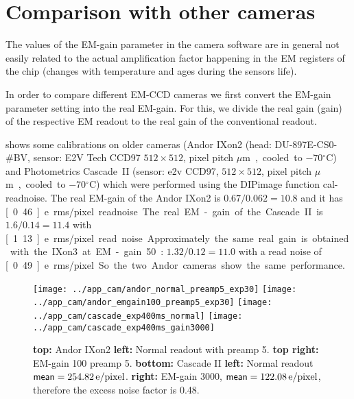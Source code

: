 \section{Comparison with other cameras}
The values of the EM-gain parameter in the camera software are in
general not easily related to the actual amplification factor
happening in the EM registers of the chip (changes with temperature
and ages during the sensors life). 

In order to compare different EM-CCD cameras we first convert the
EM-gain parameter setting into the real EM-gain. For this, we divide
the real gain (\textsf{gain}) of the respective EM readout to the real
gain of the conventional readout.

 shows some calibrations on older cameras (Andor
IXon2 (head: DU-897E-CS0-\#BV, sensor: E2V Tech CCD97 $512\times512$,
pixel pitch \unit[16]{$\mu$m}, cooled to $-70{}^\circ\textrm{C}$) and
Photometrics Cascade~II (sensor: e2v CCD97, $512\times512$, pixel
pitch \unit[16]{$\mu$m}, cooled to $-70{}^\circ\textrm{C}$) which were
performed using the DIPimage function \textsf{cal-readnoise}.  The
real EM-gain of the Andor IXon2 is $0.67/0.062=10.8$ and it has
\unit[0.46]{e\ rms/pixel} readnoise. The real EM-gain of the Cascade~II
is $1.6/0.14=11.4$ with \unit[1.13]{e\ rms/pixel} read
noise. Approximately the same real gain is obtained with the IXon3 at
EM-gain 50: $1.32/0.12=11.0$ with a read noise of \unit[0.49]{e\
  rms/pixel}. So the two Andor cameras show the same performance.

\begin{figure}
  \centering
  \texttt{[image: ../app\_cam/andor\_normal\_preamp5\_exp30]}
  \texttt{[image: ../app\_cam/andor\_emgain100\_preamp5\_exp30]}
  \texttt{[image: ../app\_cam/cascade\_exp400ms\_normal]}
  \texttt{[image: ../app\_cam/cascade\_exp400ms\_gain3000]}
  \caption{{\bf top:} Andor IXon2 {\bf left:} Normal readout with
    preamp 5. {\bf top right:} EM-gain 100 preamp 5. {\bf bottom:}
    Cascade II {\bf left:} Normal readout
    $\textsf{mean}=\unit[254.82]{e/pixel}$. {\bf right:} EM-gain 3000,
    $\textsf{mean}=\unit[122.08]{e/pixel}$, therefore the excess noise
    factor is 0.48.}
  \label{fig:old-cams}
\end{figure}



